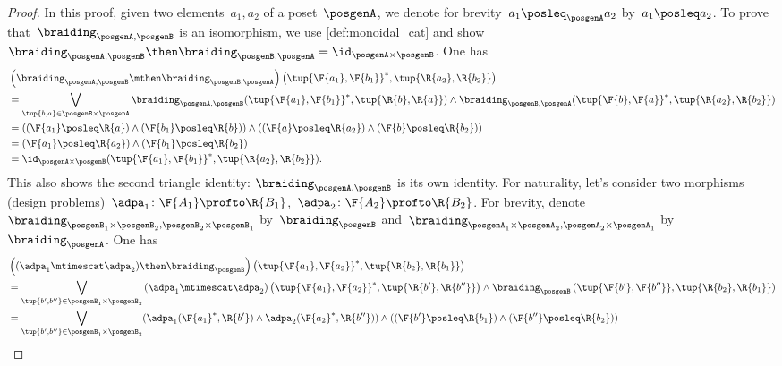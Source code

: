 \begin{proof}
  In this proof, given two elements~$a_1,a_2$ of a poset~$\posgenA$, we denote for brevity~$a_1 \posleq_\posgenA a_2$ by~$a_1 \posleq a_2$.
  To prove that~$\braiding_{\posgenA,\posgenB}$ is an isomorphism, we use \cref{def:monoidal_cat} and show~$\braiding_{\posgenA,\posgenB}\then \braiding_{\posgenB,\posgenA}=\id_{\posgenA\times \posgenB}$.
  One has
  \begin{equation}
    \begin{aligned}
      &\left( \braiding_{\posgenA,\posgenB}\mthen \braiding_{\posgenB,\posgenA}\right) \left( \tup{\F{a_1},\F{b_1}}^*,\tup{\R{a_2},\R{b_2}}\right)\\
      &=\bigvee_{\tup{b,a}\in \posgenB\times \posgenA}\braiding_{\posgenA,\posgenB}(\tup{\F{a_1},\F{b_1}}^*,\tup{\R{b},\R{a}})\wedge \braiding_{\posgenB,\posgenA}(\tup{\F{b},\F{a}}^*,\tup{\R{a_2},\R{b_2}})\\
      &=\left( (\F{a_1}\posleq \R{a}) \wedge (\F{b_1}\posleq \R{b})\right)\wedge \left((\F{a}\posleq \R{a_2}) \wedge (\F{b}\posleq \R{b_2})\right)\\
      &=(\F{a_1}\posleq \R{a_2})\wedge (\F{b_1}\posleq \R{b_2})\\
      &=\id_{\posgenA\times \posgenB}(\tup{\F{a_1},\F{b_1}}^*,\tup{\R{a_2},\R{b_2}}).
    \end{aligned}
  \end{equation}
  This also shows the second triangle identity: $\braiding_{\posgenA,\posgenB}$ is its own identity.
  For naturality, let's consider two morphisms (design problems)~$\adpa_1\colon \F{A_1}\profto \R{B_1}$,~$\adpa_2\colon \F{A_2}\profto \R{B_2}$.
  For brevity, denote~$\braiding_{\posgenB_1\times \posgenB_2,\posgenB_2\times \posgenB_1}$ by~$\braiding_\posgenB$ and~$\braiding_{\posgenA_1\times \posgenA_2,\posgenA_2\times \posgenA_1}$ by~$\braiding_\posgenA$.
  One has
  \begin{equation}
    \begin{aligned}
      &\left((\adpa_1\mtimescat \adpa_2)\then \braiding_\posgenB \right)\left( \tup{\F{a_1},\F{a_2}}^*,\tup{\R{b_2},\R{b_1}}\right)\\
      &=\bigvee_{\tup{b',b''}\in \posgenB_1\times \posgenB_2} \left(\adpa_1\mtimescat \adpa_2\right) \left( \tup{\F{a_1},\F{a_2}}^*,\tup{\R{b'},\R{b''}}\right)\wedge \braiding_\posgenB\left(\tup{\F{b'},\F{b''}},\tup{\R{b_2},\R{b_1}} \right)\\
      &=\bigvee_{\tup{b',b''}\in \posgenB_1\times \posgenB_2}(\adpa_1(\F{a_1}^*,\R{b'})\wedge \adpa_2(\F{a_2}^*,\R{b''}))\wedge (\left(\F{b'}\posleq \R{b_1}\right) \wedge \left(\F{b''}\posleq \R{b_2}\right))\\

\end{aligned}
\end{equation}
\end{proof}
